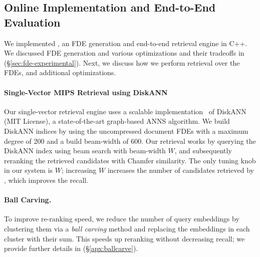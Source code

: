\subsection{Online Implementation and End-to-End Evaluation} \label{sec:online}

We implemented \name{}, an FDE generation and end-to-end retrieval engine in C++. 
%
We discussed FDE generation and various optimizations and their tradeoffs in (§\ref{sec:fde-experimental}). %
Next, we discuss how we perform retrieval over the FDEs, and additional optimizations.

\paragraph{Single-Vector MIPS Retrieval using DiskANN}
Our single-vector retrieval engine uses a scalable implementation~\cite{parlayann} of DiskANN~\cite{diskann} (MIT License), a state-of-the-art graph-based ANNS algorithm.
We build DiskANN indices by using the uncompressed document FDEs with a maximum degree of 200 and a build beam-width of 600.
Our retrieval works by querying the DiskANN index using beam search with beam-width $W$, and subsequently reranking the retrieved candidates with Chamfer similarity.
The only tuning knob in our system is $W$; increasing $W$ increases the number of candidates retrieved by \name{}, which improves the recall.

\paragraph{Ball Carving.} To improve re-ranking speed, we reduce the number of query embeddings by clustering them via a {\em ball carving} method and replacing the embeddings in each cluster with their sum. 
This speeds up reranking without decreasing recall; we provide further details in (§\ref{apx:ballcarve}).



